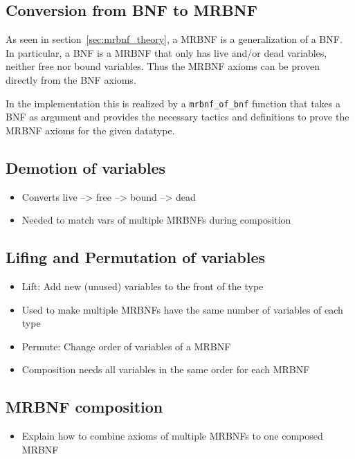 \subsection{Conversion from BNF to MRBNF}\label{sec:bnf_to_mrbnf}

As seen in section~\ref{sec:mrbnf_theory}, a \ac{MRBNF} is a generalization of a \ac{BNF}. In particular, a \ac{BNF} is a \ac{MRBNF} that only has live and/or dead variables, neither free nor bound variables. Thus the \ac{MRBNF} axioms can be proven directly from the \ac{BNF} axioms.

In the implementation this is realized by a \texttt{mrbnf\_of\_bnf} function that takes a \ac{BNF} as argument and provides the necessary tactics and definitions to prove the \ac{MRBNF} axioms for the given datatype.

\subsection{Demotion of variables}\label{sec:demote}

\begin{itemize}
\item{Converts live --> free --> bound --> dead}
\item{Needed to match vars of multiple MRBNFs during composition}
\end{itemize}

\subsection{Lifing and Permutation of variables}\label{sec:lift}

\begin{itemize}
\item{Lift: Add new (unused) variables to the front of the type}
\item{Used to make multiple MRBNFs have the same number of variables of each type}
\item{Permute: Change order of variables of a MRBNF}
\item{Composition needs all variables in the same order for each MRBNF}
\end{itemize}

\subsection{MRBNF composition}

\begin{itemize}
\item{Explain how to combine axioms of multiple MRBNFs to one composed MRBNF}
\end{itemize}

